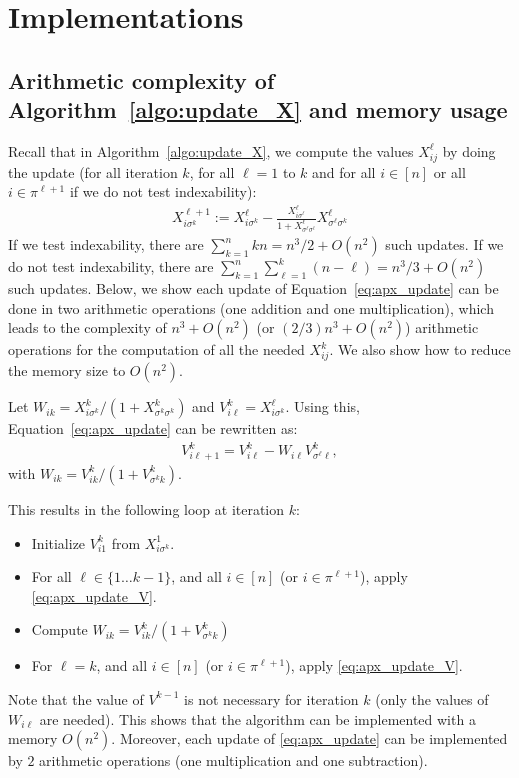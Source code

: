 \documentclass[acmsmall,screen,anonymous]{acmart}
\begin{document}
  

\section{Implementations}
\label{apx:implementation}



\subsection{Arithmetic complexity of Algorithm~\ref{algo:update_X} and memory usage}

Recall that in Algorithm~\ref{algo:update_X}, we compute the values $X^{\ell}_{ij}$ by doing the update (for all iteration $k$, for all $\ell=1$ to $k$ and for all $i\in[n]$ or all $i\in\pi^{\ell+1}$ if we do not test indexability):
\begin{align}
    \label{eq:apx_update}
    X_{i\sigma^{k}}^{\ell+1} := X_{i\sigma^{k}}^{\ell} -\displaystyle\frac{X^{\ell}_{i\sigma^{\ell}}}{1+X^{\ell}_{\sigma^{\ell}\sigma^{\ell}}} X^{\ell}_{\sigma^{\ell}\sigma^{k}}    
\end{align}
If we test indexability, there are $\sum_{k=1}^nk n = n^3/2+O(n^2)$ such updates. If we do not test indexability, there are $\sum_{k=1}^n \sum_{\ell=1}^k (n-\ell) = n^3/3 + O(n^2)$ such updates.  Below, we show each update of Equation~\eqref{eq:apx_update} can be done in two arithmetic operations (one addition and one multiplication), which leads to the complexity of $n^3+O(n^2)$ (or $(2/3)n^3+O(n^2)$) arithmetic operations for the computation of all the needed $X^k_{ij}$.  We also show how to reduce the memory size to $O(n^2)$.

Let $W_{ik} = X^k_{i \sigma^k}/(1+X^k_{\sigma^k\sigma^k})$ and $V^k_{i\ell} = X_{i\sigma^{k}}^{\ell}$. Using this, Equation~\eqref{eq:apx_update} can be rewritten as: 
\begin{align}
    \label{eq:apx_update_V}
    V^k_{i\ell+1} = V^k_{i\ell} - W_{i\ell} V^k_{\sigma^\ell\ell},
\end{align}
with $W_{ik} = V^k_{ik}/(1+V^k_{\sigma^kk})$. 

This results in the following loop at iteration $k$:
\begin{itemize}
    \item Initialize $V^k_{i1}$ from $X^1_{i\sigma^k}$. 
    \item For all $\ell\in\{1\dots k-1\}$, and all $i\in[n]$ (or $i\in\pi^{\ell+1}$), apply \eqref{eq:apx_update_V}. 
    \item Compute $W_{ik}= V^k_{ik}/(1+V^k_{\sigma^kk})$
    \item For $\ell=k$, and all $i\in[n]$ (or $i\in\pi^{\ell+1}$), apply \eqref{eq:apx_update_V}.
\end{itemize}
Note that the value of $V^{k-1}$ is not necessary for iteration $k$ (only the values of $W_{i\ell}$ are needed). This shows that the algorithm can be implemented with a memory $O(n^2)$. Moreover, each update of \eqref{eq:apx_update} can be implemented by $2$ arithmetic operations (one multiplication and one subtraction). 
\end{document}
